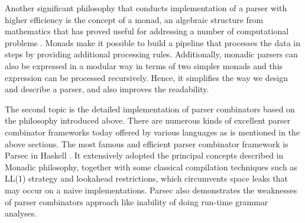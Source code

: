 Another significant philosophy that conducts implementation of a parser with higher efficiency is the concept of a monad, an algebraic structure from mathematics that has proved useful for addressing a number of computational problems \cite{Hutton:1996}. Monads make it possible to build a pipeline that processes the data in steps by providing additional processing rules. Additionally, monadic parsers can also be expressed in a modular way in terms of two simpler monads and this expression can be processed recursively. Hence, it simplifies the way we design and describe a parser, and also improves the readability.

The second topic is the detailed implementation of parser combinators based on the philosophy introduced above. There are numerous kinds of excellent parser combinator frameworks today offered by various languages as is mentioned in the above sections. The most famous and efficient parser combinator framework is Parsec in Haskell \cite{Fokker:1995}. It extensively adopted the principal concepts described in Monadic philosophy, together with some classical compilation techniques such as LL(1) strategy and lookahead restrictions, which circumvents space leaks that may occur on a naive implementations. Parsec also demonstrates the weaknesses of parser combinators approach like inability of doing run-time grammar analyses.

